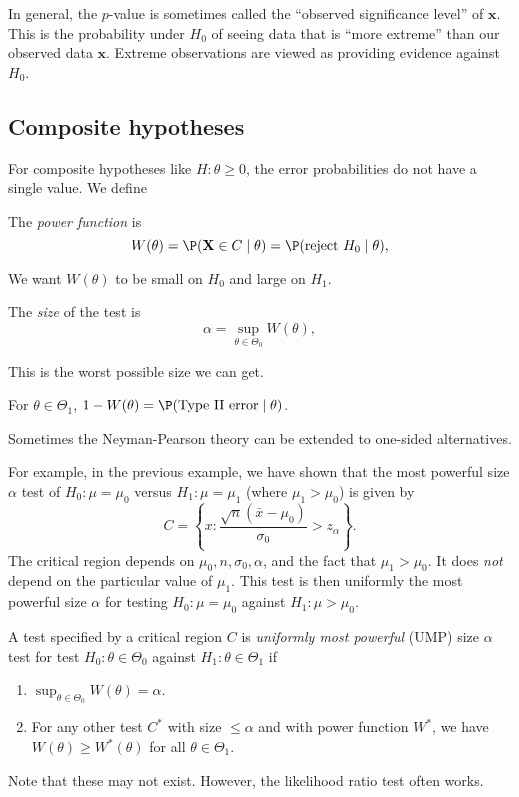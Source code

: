 \documentclass[a4paper]{article}
\begin{document}
In general, the $p$-value is sometimes called the ``observed significance level'' of $\mathbf{x}$. This is the probability under $H_0$ of seeing data that is ``more extreme'' than our observed data $\mathbf{x}$. Extreme observations are viewed as providing evidence against $H_0$.

\subsection{Composite hypotheses}
For composite hypotheses like $H:\theta \geq 0$, the error probabilities do not have a single value. We define
\begin{defi}
  The \emph{power function} is
  \[
    W(\theta) = \P(\mathbf{X}\in C\mid \theta) = \P(\text{reject }H_0\mid \theta),
  \]
\end{defi}
We want $W(\theta)$ to be small on $H_0$ and large on $H_1$.

\begin{defi}[Size]
  The \emph{size} of the test is
  \[
    \alpha =\sup_{\theta\in \Theta_0}W(\theta),
  \]
\end{defi}
This is the worst possible size we can get.

For $\theta\in \Theta_1$, $1 - W(\theta) = \P(\text{Type II error}\mid \theta)$.

Sometimes the Neyman-Pearson theory can be extended to one-sided alternatives.

For example, in the previous example, we have shown that the most powerful size $\alpha$ test of $H_0: \mu = \mu_0$ versus $H_1: \mu = \mu_1$ (where $\mu_1 > \mu_0$) is given by
\[
  C = \left\{x: \frac{\sqrt{n}(\bar x - \mu_0)}{\sigma_0} > z_\alpha\right\}.
\]
The critical region depends on $\mu_0, n, \sigma_0, \alpha$, and the fact that $\mu_1 > \mu_0$. It does \emph{not} depend on the particular value of $\mu_1$. This test is then uniformly the most powerful size $\alpha$ for testing $H_0: \mu = \mu_0$ against $H_1: \mu> \mu_0$.

\begin{defi}
  A test specified by a critical region $C$ is \emph{uniformly most powerful} (UMP) size $\alpha$ test for test $H_0:\theta\in \Theta_0$ against $H_1: \theta \in \Theta_1$ if
  \begin{enumerate}
    \item $\sup_{\theta\in \Theta_0} W(\theta) = \alpha$.
    \item For any other test $C^*$ with size $\leq \alpha$ and with power function $W^*$, we have $W(\theta) \geq W^*(\theta)$ for all $\theta\in \Theta_1$.
  \end{enumerate}
  Note that these may not exist. However, the likelihood ratio test often works.
\end{defi}
\end{document}
